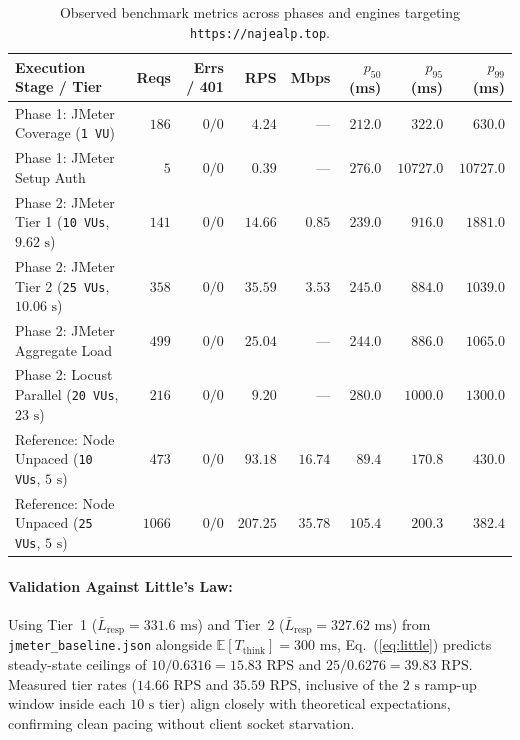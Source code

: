 \documentclass[11pt,letterpaper]{article}
\begin{document}
\begin{table}[H]
\centering
\caption{Observed benchmark metrics across phases and engines targeting \texttt{https://najealp.top}.}
\label{tab:results}
\footnotesize
\setlength{\tabcolsep}{4.5pt}
\begin{tabular}{@{}l r r r r r r r@{}}
\toprule
\textbf{Execution Stage / Tier} & \textbf{Reqs} & \textbf{Errs / 401} & \textbf{RPS} & \textbf{Mbps} & \textbf{$p_{50}$ (ms)} & \textbf{$p_{95}$ (ms)} & \textbf{$p_{99}$ (ms)} \\
\midrule
Phase 1: JMeter Coverage (\texttt{1 VU}) & $186$ & $0 / 0$ & $4.24$ & --- & $212.0$ & $322.0$ & $630.0$ \\
Phase 1: JMeter Setup Auth & $5$ & $0 / 0$ & $0.39$ & --- & $276.0$ & $10727.0$ & $10727.0$ \\
\midrule
Phase 2: JMeter Tier 1 (\texttt{10 VUs}, $9.62\text{ s}$) & $141$ & $0 / 0$ & $14.66$ & $0.85$ & $239.0$ & $916.0$ & $1881.0$ \\
Phase 2: JMeter Tier 2 (\texttt{25 VUs}, $10.06\text{ s}$) & $358$ & $0 / 0$ & $35.59$ & $3.53$ & $245.0$ & $884.0$ & $1039.0$ \\
Phase 2: JMeter Aggregate Load & $499$ & $0 / 0$ & $25.04$ & --- & $244.0$ & $886.0$ & $1065.0$ \\
\midrule
Phase 2: Locust Parallel (\texttt{20 VUs}, $23\text{ s}$) & $216$ & $0 / 0$ & $9.20$ & --- & $280.0$ & $1000.0$ & $1300.0$ \\
\midrule
Reference: Node Unpaced (\texttt{10 VUs}, $5\text{ s}$) & $473$ & $0 / 0$ & $93.18$ & $16.74$ & $89.4$ & $170.8$ & $430.0$ \\
Reference: Node Unpaced (\texttt{25 VUs}, $5\text{ s}$) & $1066$ & $0 / 0$ & $207.25$ & $35.78$ & $105.4$ & $200.3$ & $382.4$ \\
\bottomrule
\end{tabular}
\end{table}

\paragraph{Validation Against Little's Law:} Using Tier~1 ($\bar{L}_{\text{resp}} = 331.6\text{ ms}$) and Tier~2 ($\bar{L}_{\text{resp}} = 327.62\text{ ms}$) from \texttt{jmeter\_baseline.json} alongside $\mathbb{E}[T_{\text{think}}] = 300\text{ ms}$, Eq.~(\ref{eq:little}) predicts steady-state ceilings of $10 / 0.6316 = 15.83\text{ RPS}$ and $25 / 0.6276 = 39.83\text{ RPS}$. Measured tier rates ($14.66\text{ RPS}$ and $35.59\text{ RPS}$, inclusive of the $2\text{ s}$ ramp-up window inside each $10\text{ s}$ tier) align closely with theoretical expectations, confirming clean pacing without client socket starvation.
\end{document}
